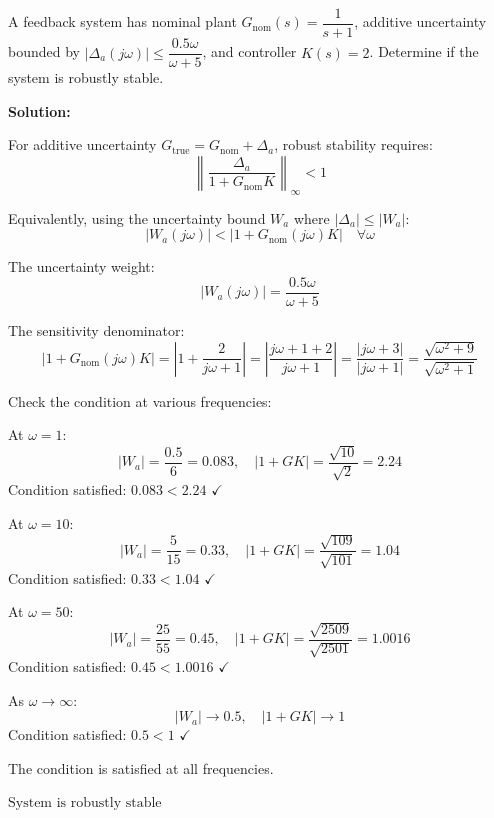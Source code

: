 \begin{example}
\label{ex:robust_analysis}
A feedback system has nominal plant $G_{\text{nom}}(s) = \dfrac{1}{s+1}$, additive uncertainty bounded by $|\Delta_a(j\omega)| \leq \dfrac{0.5\omega}{\omega + 5}$, and controller $K(s) = 2$. Determine if the system is robustly stable.

\textbf{Solution:}

For additive uncertainty $G_{\text{true}} = G_{\text{nom}} + \Delta_a$, robust stability requires:
\begin{equation*}
\left\| \frac{\Delta_a}{1 + G_{\text{nom}} K} \right\|_\infty < 1
\end{equation*}

Equivalently, using the uncertainty bound $W_a$ where $|\Delta_a| \leq |W_a|$:
\begin{equation*}
|W_a(j\omega)| < |1 + G_{\text{nom}}(j\omega) K| \quad \forall \omega
\end{equation*}

The uncertainty weight:
\begin{equation*}
|W_a(j\omega)| = \frac{0.5\omega}{\omega + 5}
\end{equation*}

The sensitivity denominator:
\begin{equation*}
|1 + G_{\text{nom}}(j\omega) K| = \left|1 + \frac{2}{j\omega + 1}\right| = \left|\frac{j\omega + 1 + 2}{j\omega + 1}\right| = \frac{|j\omega + 3|}{|j\omega + 1|} = \frac{\sqrt{\omega^2 + 9}}{\sqrt{\omega^2 + 1}}
\end{equation*}

Check the condition at various frequencies:

At $\omega = 1$:
\begin{equation*}
|W_a| = \frac{0.5}{6} = 0.083, \quad |1+GK| = \frac{\sqrt{10}}{\sqrt{2}} = 2.24
\end{equation*}
Condition satisfied: $0.083 < 2.24$ $\checkmark$

At $\omega = 10$:
\begin{equation*}
|W_a| = \frac{5}{15} = 0.33, \quad |1+GK| = \frac{\sqrt{109}}{\sqrt{101}} = 1.04
\end{equation*}
Condition satisfied: $0.33 < 1.04$ $\checkmark$

At $\omega = 50$:
\begin{equation*}
|W_a| = \frac{25}{55} = 0.45, \quad |1+GK| = \frac{\sqrt{2509}}{\sqrt{2501}} = 1.0016
\end{equation*}
Condition satisfied: $0.45 < 1.0016$ $\checkmark$

As $\omega \to \infty$:
\begin{equation*}
|W_a| \to 0.5, \quad |1+GK| \to 1
\end{equation*}
Condition satisfied: $0.5 < 1$ $\checkmark$

The condition is satisfied at all frequencies.

$\boxed{\text{System is robustly stable}}$
\end{example}

